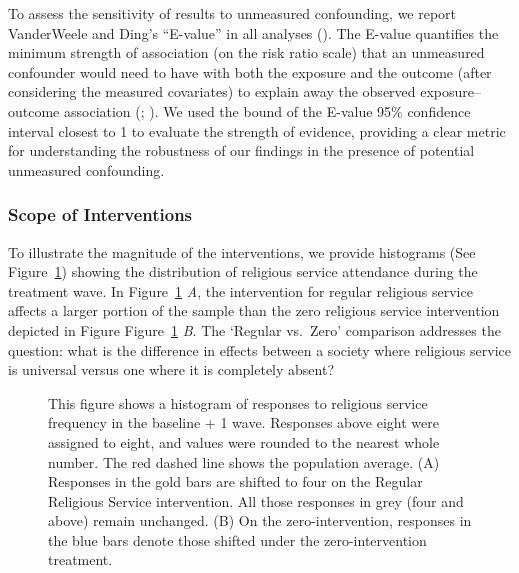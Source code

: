 \documentclass[
  single column]{article}
\begin{document}
To assess the sensitivity of results to unmeasured confounding, we
report VanderWeele and Ding's ``E-value'' in all analyses
(). The E-value
quantifies the minimum strength of association (on the risk ratio scale)
that an unmeasured confounder would need to have with both the exposure
and the outcome (after considering the measured covariates) to explain
away the observed exposure--outcome association
(;
). We used
the bound of the E-value 95\% confidence interval closest to 1 to
evaluate the strength of evidence, providing a clear metric for
understanding the robustness of our findings in the presence of
potential unmeasured confounding.

\subsubsection{Scope of Interventions}\label{scope-of-interventions}

To illustrate the magnitude of the interventions, we provide histograms
(See Figure~\ref{fig-hist}) showing the distribution of religious
service attendance during the treatment wave. In Figure~\ref{fig-hist}
\emph{A}, the intervention for regular religious service affects a
larger portion of the sample than the zero religious service
intervention depicted in Figure Figure~\ref{fig-hist} \emph{B}. The
`Regular vs.~Zero' comparison addresses the question: what is the
difference in effects between a society where religious service is
universal versus one where it is completely absent?

\begin{figure}


\caption{\label{fig-hist}This figure shows a histogram of responses to
religious service frequency in the baseline + 1 wave. Responses above
eight were assigned to eight, and values were rounded to the nearest
whole number. The red dashed line shows the population average. (A)
Responses in the gold bars are shifted to four on the Regular Religious
Service intervention. All those responses in grey (four and above)
remain unchanged. (B) On the zero-intervention, responses in the blue
bars denote those shifted under the zero-intervention treatment.}

\end{figure}%
\end{document}
